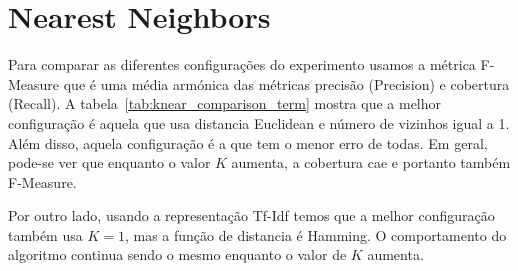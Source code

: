 \section{Nearest Neighbors}
\label{sec:knn}

Para comparar as diferentes configurações do experimento usamos a métrica F-Measure que é uma média armónica das métricas precisão (Precision) e cobertura (Recall). A tabela~\ref{tab:knear_comparison_term} mostra que a melhor configuração é aquela que usa distancia Euclidean e número de vizinhos igual a 1. Além disso, aquela configuração é a que tem o menor erro de todas. Em geral, pode-se ver que enquanto o valor $K$ aumenta, a cobertura cae e portanto também F-Measure.



Por outro lado, usando a representação Tf-Idf temos que a melhor configuração também usa $K=1$, mas a função de distancia é Hamming. O comportamento do algoritmo continua sendo o mesmo enquanto o valor de $K$ aumenta.



%
%